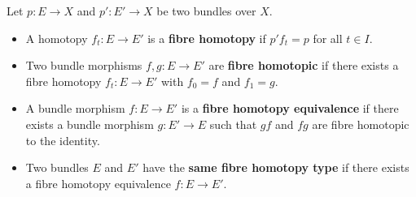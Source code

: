 Let $p: E \rightarrow X$ and $p': E' \rightarrow X$ be two bundles over $X$.
\begin{itemize}
\item A homotopy $f_t: E \rightarrow E'$ is a \textbf{fibre homotopy} if $p' f_t = p$ for all $t \in I$.
\item Two bundle morphisms $f, g: E \rightarrow E'$ are \textbf{fibre homotopic} if there exists a fibre homotopy $f_t: E \rightarrow E'$ with $f_0 = f$ and $f_1 = g$.
\item A bundle morphism $f: E \rightarrow E'$ is a \textbf{fibre homotopy equivalence} if there exists a bundle morphism $g: E' \rightarrow E$ such that $g f$ and $f g$ are fibre homotopic to the identity.
\item Two bundles $E$ and $E'$ have the \textbf{same fibre homotopy type} if there exists a fibre homotopy equivalence $f: E \rightarrow E'$.
\end{itemize}
